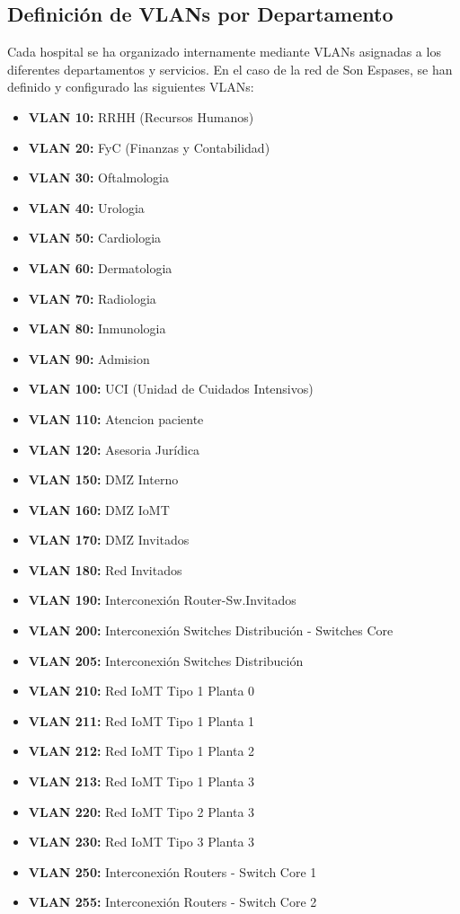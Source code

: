 \subsection{Definición de VLANs por Departamento}
\label{subsec:VLANs}
Cada hospital se ha organizado internamente mediante VLANs asignadas a los diferentes departamentos y servicios. En el caso de la red de Son Espases, se han definido y configurado 
las siguientes VLANs: 
\begin{itemize}
    \item \textbf{VLAN 10:} RRHH (Recursos Humanos)
    \item \textbf{VLAN 20:} FyC (Finanzas y Contabilidad)
    \item \textbf{VLAN 30:} Oftalmologia
    \item \textbf{VLAN 40:} Urologia 
    \item \textbf{VLAN 50:} Cardiologia 
    \item \textbf{VLAN 60:} Dermatologia 
    \item \textbf{VLAN 70:} Radiologia 
    \item \textbf{VLAN 80:} Inmunologia 
    \item \textbf{VLAN 90:} Admision
    \item \textbf{VLAN 100:} UCI (Unidad de Cuidados Intensivos)
    \item \textbf{VLAN 110:} Atencion paciente 
    \item \textbf{VLAN 120:} Asesoria Jurídica
    \item \textbf{VLAN 150:} DMZ Interno
    \item \textbf{VLAN 160:} DMZ IoMT
    \item \textbf{VLAN 170:} DMZ Invitados
    \item \textbf{VLAN 180:} Red Invitados
    \item \textbf{VLAN 190:} Interconexión Router-Sw.Invitados
    \item \textbf{VLAN 200:} Interconexión Switches Distribución - Switches Core
    \item \textbf{VLAN 205:} Interconexión Switches Distribución
    \item \textbf{VLAN 210:} Red IoMT Tipo 1 Planta 0
    \item \textbf{VLAN 211:} Red IoMT Tipo 1 Planta 1
    \item \textbf{VLAN 212:} Red IoMT Tipo 1 Planta 2
    \item \textbf{VLAN 213:} Red IoMT Tipo 1 Planta 3
    \item \textbf{VLAN 220:} Red IoMT Tipo 2 Planta 3
    \item \textbf{VLAN 230:} Red IoMT Tipo 3 Planta 3
    \item \textbf{VLAN 250:} Interconexión Routers - Switch Core 1
    \item \textbf{VLAN 255:} Interconexión Routers - Switch Core 2
\end{itemize}

